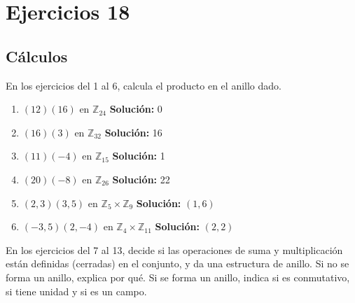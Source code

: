 \section*{Ejercicios 18}

\subsection*{Cálculos}
\noindent
En los ejercicios del 1 al 6, calcula el producto en el anillo dado.

\begin{enumerate}
	\item $(12)(16)$ en $\mathbb{Z}_{24}$ \textbf{Solución:} 0
	\item $(16)(3)$ en $\mathbb{Z}_{32}$ \textbf{Solución:} 16
	\item $(11)(-4)$ en $\mathbb{Z}_{15}$ \textbf{Solución:} 1
	\item $(20)(-8)$ en $\mathbb{Z}_{26}$ \textbf{Solución:} 22
	\item $(2,3)(3,5)$ en $\mathbb{Z}_5 \times \mathbb{Z}_9$ \textbf{Solución:} $(1,6)$
	\item $(-3,5)(2,-4)$ en $\mathbb{Z}_4 \times \mathbb{Z}_{11}$ \textbf{Solución:} $(2,2)$
\end{enumerate}
En los ejercicios del 7 al 13, decide si las operaciones de suma y multiplicación están definidas (cerradas) en el conjunto, y da una estructura de anillo. Si no se forma un anillo, explica por qué. Si se forma un anillo, indica si es conmutativo, si tiene unidad y si es un campo.

